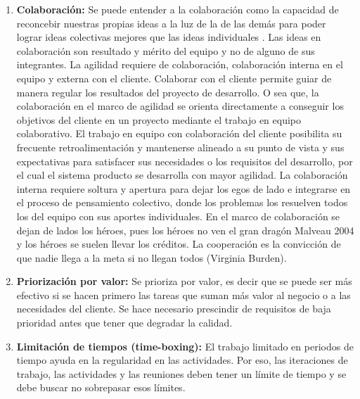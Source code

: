\begin{enumerate}
\item \textbf{Colaboración:} Se puede entender a la colaboración como la capacidad de reconcebir nuestras propias ideas a la luz de la de las demás \cite{Austin-2003} para poder lograr ideas colectivas mejores que las ideas individuales \cite{UNTREF-2014}. Las ideas en colaboración son resultado y mérito del equipo y no de alguno de sus integrantes. La agilidad requiere de colaboración, colaboración interna en el equipo y externa con el cliente. Colaborar con el cliente permite guiar de manera regular los resultados del proyecto de desarrollo. O sea que, la colaboración en el marco de agilidad se orienta directamente a conseguir los objetivos del cliente en un proyecto mediante el trabajo en equipo colaborativo. El trabajo en equipo con colaboración del cliente posibilita su frecuente retroalimentación y mantenerse alineado a su punto de vista y sus expectativas para satisfacer sus necesidades o los requisitos del desarrollo, por el cual el sistema producto se desarrolla con mayor agilidad. La colaboración interna requiere soltura y apertura para dejar los egos de lado e integrarse en el proceso de pensamiento colectivo, donde los problemas los resuelven todos los del equipo con sus aportes individuales. En el marco de colaboración se dejan de lados los héroes, pues los héroes no ven el gran dragón Malveau 2004 y los héroes se suelen llevar los créditos. La cooperación es la convicción de que nadie llega a la meta si no llegan todos (Virginia Burden).

\item \textbf{Priorización por valor:} Se prioriza por valor, es decir que se puede ser más efectivo si se hacen primero las tareas que suman más valor al negocio o a las necesidades del cliente. Se hace necesario prescindir de requisitos de baja prioridad antes que tener que degradar la calidad.

\item \textbf{Limitación de tiempos (time-boxing):} El trabajo limitado en periodos de tiempo ayuda en la regularidad en las actividades. Por eso, las iteraciones de trabajo, las actividades y las reuniones deben tener un límite de tiempo y se debe buscar no sobrepasar esos límites.


\end{enumerate}
